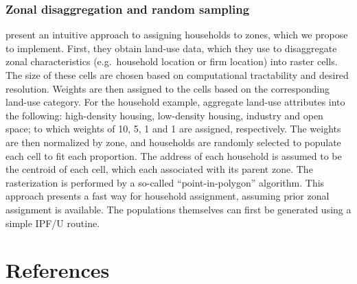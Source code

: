 \documentclass{article}
\begin{document}
\subsubsection{Zonal disaggregation and random sampling}
\textcite{moekel2003microsimulation} present an intuitive approach to assigning households to zones, which we propose to implement.
First, they obtain land-use data, which they use to disaggregate zonal characteristics (e.g.\ household location or firm location) into raster cells.
The size of these cells are chosen based on computational tractability and desired resolution.
Weights are then assigned to the cells based on the corresponding land-use category.
For the household example, \textcite{moekel2003microsimulation} aggregate land-use attributes into the following: high-density housing, low-density housing, industry and open space;
to which weights of 10, 5, 1 and 1 are assigned, respectively.
The weights are then normalized by zone, and households are randomly selected to populate each cell to fit each proportion.
The address of each household is assumed to be the centroid of each cell, which each associated with its parent zone.
The rasterization is performed by a so-called ``point-in-polygon'' algorithm.
This approach presents a fast way for household assignment, assuming prior zonal assignment is available.
The populations themselves can first be generated using a simple IPF/U routine.

\newpage
\section{References}
\printbibliography[heading=none]
\end{document}
